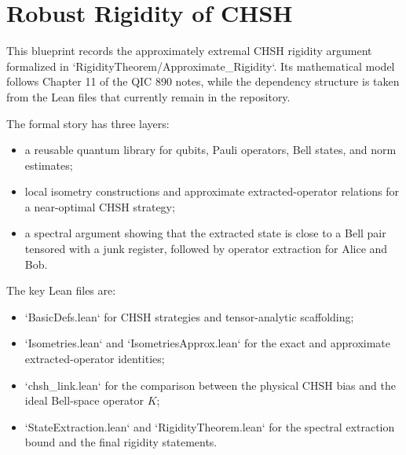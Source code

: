 \chapter{Robust Rigidity of CHSH}
\label{ch:robust-chsh}

This blueprint records the approximately extremal CHSH rigidity argument formalized in
`RigidityTheorem/Approximate_Rigidity`.
Its mathematical model follows Chapter 11 of the QIC 890 notes, while the dependency structure is taken from the Lean files that currently remain in the repository.

The formal story has three layers:

\begin{itemize}
\item a reusable quantum library for qubits, Pauli operators, Bell states, and norm estimates;
\item local isometry constructions and approximate extracted-operator relations for a near-optimal CHSH strategy;
\item a spectral argument showing that the extracted state is close to a Bell pair tensored with a junk register, followed by operator extraction for Alice and Bob.
\end{itemize}

The key Lean files are:

\begin{itemize}
\item `BasicDefs.lean` for CHSH strategies and tensor-analytic scaffolding;
\item `Isometries.lean` and `IsometriesApprox.lean` for the exact and approximate extracted-operator identities;
\item `chsh_link.lean` for the comparison between the physical CHSH bias and the ideal Bell-space operator $K$;
\item `StateExtraction.lean` and `RigidityTheorem.lean` for the spectral extraction bound and the final rigidity statements.
\end{itemize}
